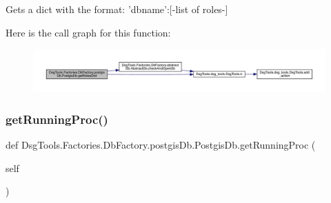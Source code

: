 \begin{DoxyVerb}Gets a dict with the format: 'dbname':{[-list of roles-]}
\end{DoxyVerb}
 Here is the call graph for this function\+:
\nopagebreak
\begin{figure}[H]
\begin{center}
\leavevmode
\includegraphics[width=350pt]{class_dsg_tools_1_1_factories_1_1_db_factory_1_1postgis_db_1_1_postgis_db_a1610b2ba4a7dce980f65c02acbf15b01_cgraph}
\end{center}
\end{figure}
\mbox{\label{class_dsg_tools_1_1_factories_1_1_db_factory_1_1postgis_db_1_1_postgis_db_add84568ef5bdb462f01ceee72a8c9aed}} 
\subsubsection{\texorpdfstring{get\+Running\+Proc()}{getRunningProc()}}
{\footnotesize\ttfamily def Dsg\+Tools.\+Factories.\+Db\+Factory.\+postgis\+Db.\+Postgis\+Db.\+get\+Running\+Proc (\begin{DoxyParamCaption}\item[{}]{self }\end{DoxyParamCaption})}

